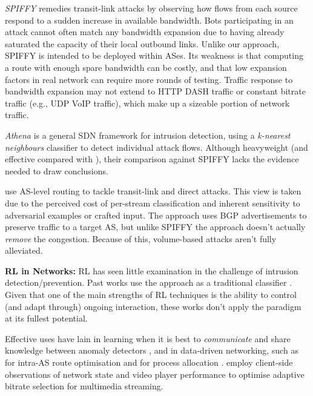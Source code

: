 \documentclass[10pt, times, conference, letterpaper]{IEEEtran}
\newcommand{\fakepara}[1]{\noindent\textbf{#1:}}
\begin{document}
\emph{SPIFFY} \cite{DBLP:conf/ndss/KangGS16} remedies transit-link attacks by observing how flows from each source respond to a sudden increase in available bandwidth.
Bots participating in an attack cannot often match any bandwidth expansion due to having already saturated the capacity of their local outbound links.
Unlike our approach, SPIFFY is intended to be deployed within ASes.
Its weakness is that computing a route with enough spare bandwidth can be costly, and that low expansion factors in real network can require more rounds of testing. 
Traffic response to bandwidth expansion may not extend to HTTP DASH traffic or constant bitrate traffic (e.g., UDP VoIP traffic), which make up a sizeable portion of network traffic.

\emph{Athena} \cite{DBLP:conf/dsn/LeeKSPY17} is a general SDN framework for intrusion detection, using a \emph{k-nearest neighbours} classifier to detect individual attack flows.
Although heavyweight (and effective compared with \textcite{DBLP:conf/lcn/BragaMP10}), their comparison against SPIFFY lacks the evidence needed to draw conclusions.

\Textcite{DBLP:conf/sp/SmithS18} use AS-level routing to tackle transit-link and direct attacks.
This view is taken due to the perceived cost of per-stream classification and inherent sensitivity to adversarial examples or crafted input.
The approach uses BGP advertisements to preserve traffic to a target AS, but unlike SPIFFY the approach doesn't actually \emph{remove} the congestion.
Because of this, volume-based attacks aren't fully alleviated.

\fakepara{RL in Networks}
RL has seen little examination in the challenge of intrusion detection/prevention.
Past works use the approach as a traditional classifier \cite{shamshirband2014anomaly,DBLP:conf/mates/ServinK08}.
Given that one of the main strengths of RL techniques is the ability to control (and adapt through) ongoing interaction, these works don't apply the paradigm at its fullest potential.

Effective uses have lain in learning when it is best to \emph{communicate} and share knowledge between anomaly detectors \cite{DBLP:conf/paisi/XuSH07}, and in data-driven networking, such as for intra-AS route optimisation \cite{DBLP:conf/hotnets/ValadarskySST17} and for process allocation \cite{DBLP:conf/hotnets/MaoAMK16}.
\Textcite{DBLP:conf/sigcomm/MaoNA17} employ client-side observations of network state and video player performance to optimise adaptive bitrate selection for multimedia streaming.
\end{document}

